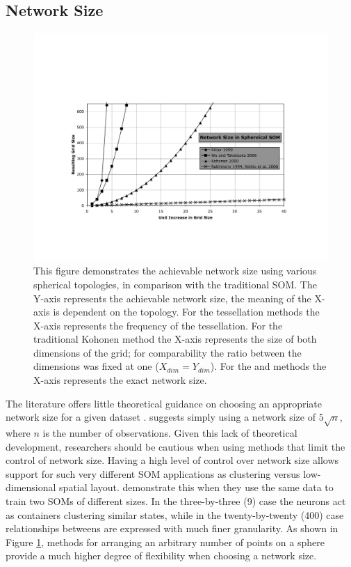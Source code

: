 \documentclass[10pt,titlepage]{article}
\begin{document}
\subsection{Network Size}
\begin{figure}
\centering
\includegraphics[width=\linewidth]{networkSize.pdf}
\caption{This figure demonstrates the achievable network size using various
spherical topologies, in comparison with the traditional SOM. The Y-axis represents the achievable network size, the
meaning of the X-axis is dependent on the topology. For the tessellation
methods the X-axis represents the frequency of the tessellation. For the
traditional Kohonen method the X-axis represents the size of both dimensions of
the grid; for comparability the ratio between the dimensions was fixed at one
($X_{dim}=Y_{dim}$).  For the \cite{Rakhmanov94} and \cite{Nishio:2006fk} methods the X-axis
represents the exact network size.}
\label{fig:nSize}
\end{figure}
The literature offers little theoretical guidance on choosing an appropriate
network size for a given dataset \citep{cho1996}.  \cite{toolbox} suggests
simply using a network size of \(5\sqrt {n}\), where \(n\) is the number of
observations. Given this lack of theoretical development, researchers should be
cautious when using methods that limit the control of network size.  Having a
high level of control over network size allows support for such very
different SOM applications as clustering versus low-dimensional spatial layout.
\cite{skupin07} demonstrate this when they use the same data to train two SOMs
of different sizes.  In the three-by-three (9) case the neurons act as
containers clustering similar states, while in the twenty-by-twenty (400) case
relationships betweens are expressed with much finer granularity. As shown in
Figure \ref{fig:nSize}, methods for arranging an arbitrary number of points on a
sphere provide a much higher degree of flexibility when choosing a network
size.
\end{document}
